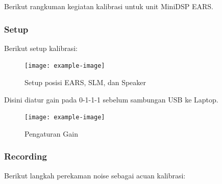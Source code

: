 \documentclass{article}
\begin{document}
	Berikut rangkuman kegiatan kalibrasi untuk unit MiniDSP EARS.

	\subsubsection{Setup}

	Berikut setup kalibrasi:

	\begin{figure}[H]
		\centering
		\texttt{[image: example-image]}
		\caption{Setup posisi EARS, SLM, dan Speaker}
	\end{figure}

	Disini diatur gain pada 0-1-1-1 sebelum sambungan USB ke Laptop.

	\begin{figure}[H]
		\centering
		\texttt{[image: example-image]}
		\caption{Pengaturan Gain}
	\end{figure}

	\subsubsection{Recording}

	Berikut langkah perekaman noise sebagai acuan kalibrasi:
\end{document}
